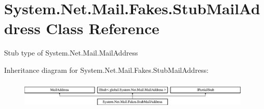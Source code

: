 \hypertarget{class_system_1_1_net_1_1_mail_1_1_fakes_1_1_stub_mail_address}{\section{System.\-Net.\-Mail.\-Fakes.\-Stub\-Mail\-Address Class Reference}
\label{class_system_1_1_net_1_1_mail_1_1_fakes_1_1_stub_mail_address}
}


Stub type of System.\-Net.\-Mail.\-Mail\-Address 


Inheritance diagram for System.\-Net.\-Mail.\-Fakes.\-Stub\-Mail\-Address\-:\begin{figure}[H]
\begin{center}
\leavevmode
\includegraphics[height=1.352657cm]{class_system_1_1_net_1_1_mail_1_1_fakes_1_1_stub_mail_address}
\end{center}
\end{figure}
